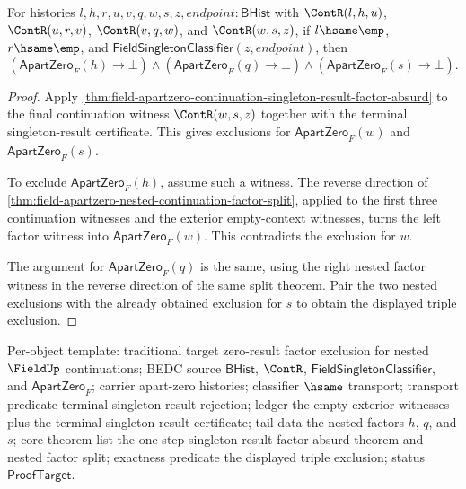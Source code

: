 \begin{theorem}
\label{thm:field-apartzero-nested-continuation-singleton-result-factor-exclusion}
For histories $l,h,r,u,v,q,w,s,z,endpoint:\mathsf{BHist}$ with
$\ContR(l,h,u)$, $\ContR(u,r,v)$, $\ContR(v,q,w)$, and $\ContR(w,s,z)$, if
$l\hsame\emp$, $r\hsame\emp$, and
$\mathsf{FieldSingletonClassifier}(z,endpoint)$, then
$$
(\mathsf{ApartZero}_F(h)\to\bot)
\land
(\mathsf{ApartZero}_F(q)\to\bot)
\land
(\mathsf{ApartZero}_F(s)\to\bot).
$$
\end{theorem}
\begin{proof}
Apply
\autoref{thm:field-apartzero-continuation-singleton-result-factor-absurd} to
the final continuation witness $\ContR(w,s,z)$ together with the terminal
singleton-result certificate. This gives exclusions for
$\mathsf{ApartZero}_F(w)$ and $\mathsf{ApartZero}_F(s)$.

To exclude $\mathsf{ApartZero}_F(h)$, assume such a witness. The reverse
direction of
\autoref{thm:field-apartzero-nested-continuation-factor-split}, applied to the
first three continuation witnesses and the exterior empty-context witnesses,
turns the left factor witness into $\mathsf{ApartZero}_F(w)$. This contradicts
the exclusion for $w$.

The argument for $\mathsf{ApartZero}_F(q)$ is the same, using the right nested
factor witness in the reverse direction of the same split theorem. Pair the two
nested exclusions with the already obtained exclusion for $s$ to obtain the
displayed triple exclusion.
\end{proof}

Per-object template: traditional target zero-result factor exclusion for nested
$\FieldUp$ continuations; BEDC source $\mathsf{BHist}$, $\ContR$,
$\mathsf{FieldSingletonClassifier}$, and $\mathsf{ApartZero}_F$; carrier
apart-zero histories; classifier $\hsame$ transport; transport predicate
terminal singleton-result rejection; ledger the empty exterior witnesses plus
the terminal singleton-result certificate; tail data the nested factors $h$,
$q$, and $s$; core theorem list the one-step singleton-result factor absurd
theorem and nested factor split; exactness predicate the displayed triple
exclusion; status $\mathsf{ProofTarget}$.

